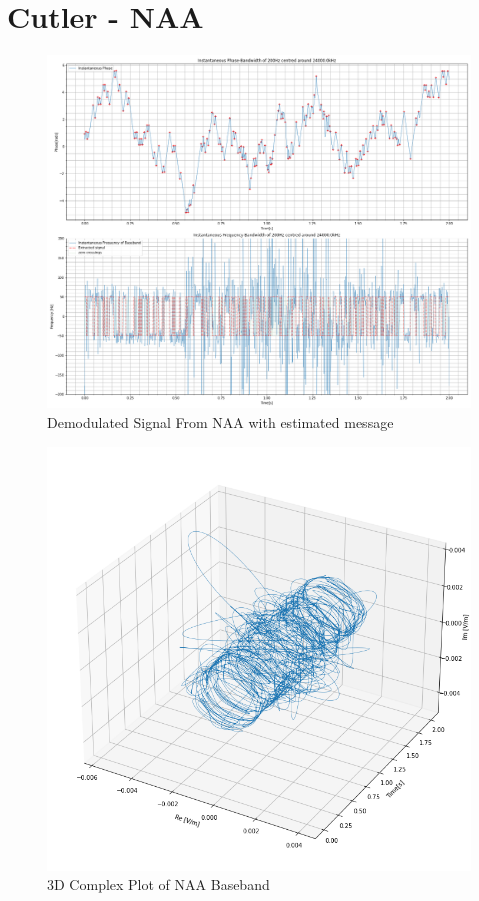 \section{Cutler - \textbf{NAA}}
\begin{figure}[H]
    \centering
    \includegraphics[width = \textwidth]{figs/AppA/NAA.png}
    \caption{Demodulated Signal From NAA with estimated message}
    \label{fig:my_label}
\end{figure}
\begin{figure}[H]
    \centering
    \includegraphics[width = \textwidth]{figs/AppA/naa3D.png}
    \caption{3D Complex Plot of NAA Baseband}
    \label{fig:my_label}
\end{figure}